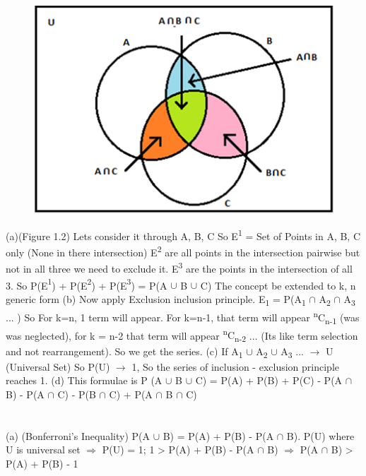 \documentclass{report}
\begin{document}
{	\section{}
	\begin{figure}
		\centering
		\includegraphics[width=0.7\linewidth]{screenshot002}
		\caption{}
		\label{fig:screenshot002}
	\end{figure}
	(a)(Figure 1.2) Lets consider it through A, B, C So E{\textsuperscript{1}} = Set of Points in A, B, C only (None in there intersection)
	E{\textsuperscript{2}} are all points in the intersection pairwise but not in all three we need to exclude it. E{\textsuperscript{3}} are the points in the intersection of all 3. So P(E{\textsuperscript{1}}) + P(E{\textsuperscript{2}}) + P(E{\textsuperscript{3}}) = P(A {$\cup$} B {$\cup$} C) The concept be extended to k, n generic form
	{\newline}
	(b) Now apply Exclusion inclusion principle. E{\textsubscript{1}} = P(A{\textsubscript{1}} {$\cap$} A{\textsubscript{2}} {$\cap$} A{\textsubscript{3}} ... ) So For k=n, 1 term will appear. For k=n-1, that term will appear {\textsuperscript{n}C\textsubscript{n-1}} (was was neglected), for k = n-2 that term will appear {\textsuperscript{n}C\textsubscript{n-2}} ... (Its like term selection and not rearrangement). So we get the series.
	{\newline}
	(c) If A{\textsubscript{1}} $\cup$ A{\textsubscript{2}} {$\cup$} A{\textsubscript{3}} ... {$\rightarrow$} U (Universal Set) So P(U) {$\rightarrow$} 1, So the series of inclusion - exclusion principle reaches 1.
	{\newline}
	(d) This formulae is P (A {$\cup$} B {$\cup$} C) = P(A) + P(B) + P(C) - P(A {$\cap$} B) - P(A {$\cap$} C) - P(B {$\cap$} C) + P(A {$\cap$} B {$\cap$} C) 
	{\newline}
	\section{}
	(a) (Bonferroni's Inequality) P(A {$\cup$} B) = P(A) + P(B) - P(A {$\cap$} B). P(U) where U is universal set {$\Rightarrow$} P(U) = 1; 1 > P(A) + P(B) - P(A {$\cap$} B) {$\Rightarrow$} P(A {$\cap$} B) > P(A) + P(B) - 1
	
}
\end{document}
